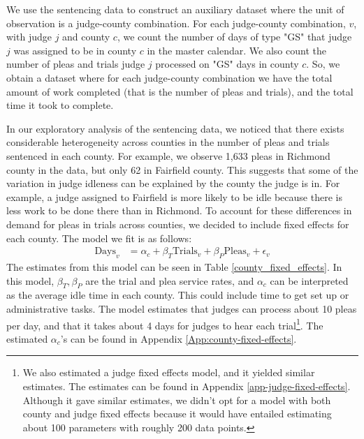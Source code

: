 \documentclass[11pt, oneside]{article}   	%
\theoremstyle{ModifiedStyle}
\begin{document}
			We use the sentencing data to construct an auxiliary dataset where the unit of observation is a judge-county combination. For each judge-county combination, $v$, with judge $j$ and county $c$, we count the number of days of type "GS" that judge $j$ was assigned to be in county $c$ in the master calendar. We also count the number of pleas and trials judge $j$ processed on "GS" days in county $c$. So, we obtain a dataset where for each judge-county combination we have the total amount of work completed (that is the number of pleas and trials), and the total time it took to complete.

			In our exploratory analysis of the sentencing data, we noticed that there exists considerable heterogeneity across counties
			in the number of pleas and trials sentenced in each county. For example, we observe 1,633 pleas in Richmond county in the data, but only 62 in Fairfield county. This suggests that some of the variation in judge idleness can be explained by the county the judge is in. For example, a judge assigned to Fairfield is more likely to be idle because there is less work to be done there than in Richmond. To account for these differences in demand for pleas in trials across counties, we decided to include fixed effects for each county. The model we fit is as follows:
			\begin{align*}
				\text{Days}_v &= \alpha_c + \beta_T \text{Trials}_v + \beta_P \text{Pleas}_v + \epsilon_v
			\end{align*}
			The estimates from this model can be seen in Table \ref{county_fixed_effects}. In this model, $\beta_T,\beta_P$ are the trial and plea service rates, and $\alpha_c$ can be interpreted as the average idle time in each county. This could include time to get set up or administrative tasks. The model estimates that
			judges can process about 10 pleas per day, and that it takes about 4 days for judges to hear each trial\footnote{We also estimated a judge fixed effects model, and it yielded similar estimates. The estimates can be found in Appendix \ref{app-judge-fixed-effects}. Although it gave similar estimates, we didn't opt for a model with both county and judge fixed effects because it would have entailed estimating about 100 parameters with roughly 200 data points.}. The estimated $\alpha_c$'s can be found in Appendix \ref{App:county-fixed-effects}.
\end{document}
